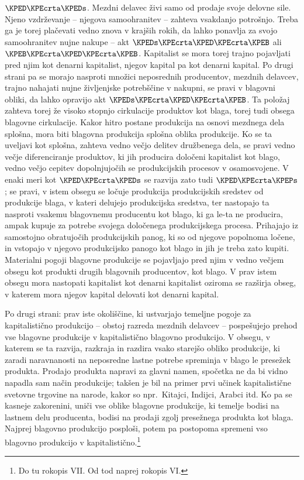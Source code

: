 \documentclass[kapital_02.tex]{subfiles}
\begin{document}
\(\KPED\KPEcrta\KPEDs\). Mezdni delavec živi samo od prodaje svoje delovne sile. Njeno vzdrževanje -- njegova samoohranitev -- zahteva vsakdanjo potrošnjo. Treba ga je torej plačevati vedno znova v krajših rokih, da lahko ponavlja za svojo samoohranitev \KPEstran nujne nakupe -- akt \(\KPEDs\KPEcrta\KPED\KPEcrta\KPEB\) ali \(\KPEB\KPEcrta\KPED\KPEcrta\KPEB\). Kapitalist se mora torej trajno pojavljati pred njim kot denarni kapitalist, njegov kapital pa kot denarni kapital. Po drugi strani pa se morajo nasproti množici neposrednih producentov, mezdnih delavcev, trajno nahajati nujne življenjske potrebščine v nakupni, se pravi v blagovni obliki, da lahko opravijo akt \(\KPEDs\KPEcrta\KPED\KPEcrta\KPEB\). Ta položaj zahteva torej že visoko stopnjo cirkulacije produktov kot blaga, torej tudi obsega blagovne cirkulacije. Kakor hitro postane produkcija na osnovi mezdnega dela splošna, mora biti blagovna produkcija splošna oblika produkcije. Ko se ta uveljavi kot splošna, zahteva vedno večjo delitev družbenega dela, se pravi vedno večje diferenciranje produktov, ki jih producira določeni kapitalist kot blago, vedno večjo cepitev dopolnjujočih se produkcijskih procesov v osamosvojene. V enaki meri kot \(\KPED\KPEcrta\KPEDs\) se razvija zato tudi \(\KPED\KPEcrta\KPEPs\); se pravi, v istem obsegu se ločuje produkcija produkcijskih sredstev od produkcije blaga, v kateri delujejo produkcijska sredstva, ter nastopajo ta nasproti vsakemu blagovnemu producentu kot blago, ki ga le-ta ne producira, ampak kupuje za potrebe svojega določenega produkcijskega procesa. Prihajajo iz samostojno obratujočih produkcijskih panog, ki so od njegove popolnoma ločene, in vstopajo v njegovo produkcijsko panogo kot blago in jih je treba zato kupiti. Materialni pogoji blagovne produkcije se pojavljajo pred njim v vedno večjem obsegu kot produkti drugih blagovnih producentov, kot blago. V prav istem obsegu mora nastopati kapitalist kot denarni kapitalist oziroma se razširja obseg, v katerem mora njegov kapital delovati kot denarni kapital.

Po drugi strani: prav iste okoliščine, ki ustvarjajo temeljne pogoje za kapitalistično produkcijo -- obstoj razreda mezdnih delavcev -- pospešujejo prehod vse blagovne produkcije v kapitalistično blagovno produkcijo. V obsegu, v katerem se ta razvija, razkraja in razdira vsako starejšo obliko produkcije, ki zaradi naravnanosti na neposredne lastne potrebe spreminja v blago le presežek produkta. Prodajo \KPEstran produkta napravi za glavni namen, spočetka ne da bi vidno napadla sam način produkcije; takšen je bil na primer prvi učinek kapitalistične svetovne trgovine na narode, kakor so npr.\ Kitajci, Indijci, Arabci itd. Ko pa se kasneje zakorenini, uniči vse oblike blagovne produkcije, ki temelje bodisi na lastnem delu producenta, bodisi na prodaji zgolj presežnega produkta kot blaga. Najprej blagovno produkcijo posploši, potem pa postopoma spremeni vso blagovno produkcijo v kapitalistično.\footnote{Do tu rokopis VII. Od tod naprej rokopis VI.}
\end{document}
